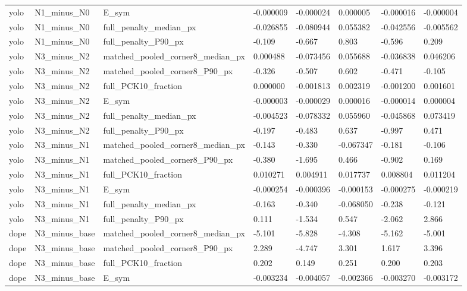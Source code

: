 \begin{table}[t]
{\begin{tabular}{llllllll}
yolo & N1\_minus\_N0 & E\_sym & -0.000009 & -0.000024 & 0.000005 & -0.000016 & -0.000004 \\
yolo & N1\_minus\_N0 & full\_penalty\_median\_px & -0.026855 & -0.080944 & 0.055382 & -0.042556 & -0.005562 \\
yolo & N1\_minus\_N0 & full\_penalty\_P90\_px & -0.109 & -0.667 & 0.803 & -0.596 & 0.209 \\
yolo & N3\_minus\_N2 & matched\_pooled\_corner8\_median\_px & 0.000488 & -0.073456 & 0.055688 & -0.036838 & 0.046206 \\
yolo & N3\_minus\_N2 & matched\_pooled\_corner8\_P90\_px & -0.326 & -0.507 & 0.602 & -0.471 & -0.105 \\
yolo & N3\_minus\_N2 & full\_PCK10\_fraction & 0.000000 & -0.001813 & 0.002319 & -0.001200 & 0.001601 \\
yolo & N3\_minus\_N2 & E\_sym & -0.000003 & -0.000029 & 0.000016 & -0.000014 & 0.000004 \\
yolo & N3\_minus\_N2 & full\_penalty\_median\_px & -0.004523 & -0.078332 & 0.055960 & -0.045868 & 0.073419 \\
yolo & N3\_minus\_N2 & full\_penalty\_P90\_px & -0.197 & -0.483 & 0.637 & -0.997 & 0.471 \\
yolo & N3\_minus\_N1 & matched\_pooled\_corner8\_median\_px & -0.143 & -0.330 & -0.067347 & -0.181 & -0.106 \\
yolo & N3\_minus\_N1 & matched\_pooled\_corner8\_P90\_px & -0.380 & -1.695 & 0.466 & -0.902 & 0.169 \\
yolo & N3\_minus\_N1 & full\_PCK10\_fraction & 0.010271 & 0.004911 & 0.017737 & 0.008804 & 0.011204 \\
yolo & N3\_minus\_N1 & E\_sym & -0.000254 & -0.000396 & -0.000153 & -0.000275 & -0.000219 \\
yolo & N3\_minus\_N1 & full\_penalty\_median\_px & -0.163 & -0.340 & -0.068050 & -0.238 & -0.121 \\
yolo & N3\_minus\_N1 & full\_penalty\_P90\_px & 0.111 & -1.534 & 0.547 & -2.062 & 2.866 \\
dope & N3\_minus\_base & matched\_pooled\_corner8\_median\_px & -5.101 & -5.828 & -4.308 & -5.162 & -5.001 \\
dope & N3\_minus\_base & matched\_pooled\_corner8\_P90\_px & 2.289 & -4.747 & 3.301 & 1.617 & 3.396 \\
dope & N3\_minus\_base & full\_PCK10\_fraction & 0.202 & 0.149 & 0.251 & 0.200 & 0.203 \\
dope & N3\_minus\_base & E\_sym & -0.003234 & -0.004057 & -0.002366 & -0.003270 & -0.003172 \\

\end{tabular}}
\end{table}
